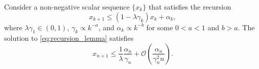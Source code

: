 \documentclass[10pt,a4paper]{amsart}
\begin{document}
\begin{lemma}\label{lem:recursion}
    Consider a non-negative scalar sequence $\{x_k\}$ that satisfies the recursion
    \begin{equation}\label{eq:recursion_lemma}
        x_{k+1} \leq (1 - \lambda \gamma_k) x_k + \alpha_k , 
    \end{equation}
    where $\lambda \gamma_1 \in (0, 1)$, $\gamma_k \propto k^{-a}$, and $\alpha_k \propto k^{-b}$ for some $0 < a  < 1$ and $b > a$. 
    The solution to \eqref{eq:recursion_lemma} satisfies
    \begin{equation}
        x_{n+1} \leq \frac{1}{\lambda} \frac{\alpha_n}{\gamma_n} 
        + \mathcal{O}\left(\frac{\alpha_n}{\gamma_n^2 n} \right)
        .
    \end{equation} 
\end{lemma}
\end{document}
